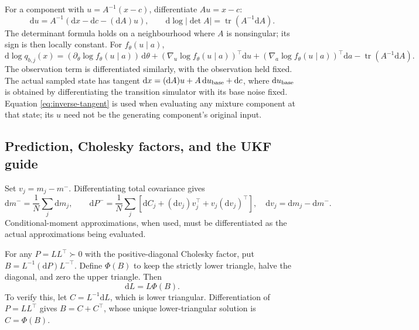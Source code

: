 \documentclass[11pt,a4paper]{article}
\newcommand{\tr}{\operatorname{tr}}
\newcommand{\dd}{\mathrm d}
\begin{document}
For a component with \(u=A^{-1}(x-c)\), differentiate \(Au=x-c\):
\begin{equation}
\label{eq:inverse-tangent}
 \dd u=A^{-1}(\dd x-\dd c-(\dd A)u),\qquad
 \dd\log|\det A|=\tr(A^{-1}\dd A).
\end{equation}
The determinant formula holds on a neighbourhood where \(A\) is
nonsingular; its sign is then locally constant. For \(f_\theta(u\mid a)\),
\begin{equation}
\label{eq:component-tangent}
 \dd\log q_{b,j}(x)
 =(\partial_\theta\log f_\theta(u\mid a))\,\dd\theta
  +(\nabla_u\log f_\theta(u\mid a))^\top\dd u
  +(\nabla_a\log f_\theta(u\mid a))^\top\dd a
  -\tr(A^{-1}\dd A).
\end{equation}
The observation term is differentiated similarly, with the observation
held fixed. The actual sampled state has tangent
\(\dd x=(\dd A)u+A\,\dd u_{\rm base}+\dd c\), where
\(\dd u_{\rm base}\) is obtained by differentiating the transition simulator
with its base noise fixed. Equation \eqref{eq:inverse-tangent} is used
when evaluating any mixture component at that state; its \(u\) need not
be the generating component's original input.

\subsection{Prediction, Cholesky factors, and the UKF guide}

Set \(v_j=m_j-m^-\). Differentiating total covariance gives
\begin{equation}
\label{eq:prediction-tangent}
 \dd m^-=\frac1N\sum_j\dd m_j,\qquad
 \dd P^-=\frac1N\sum_j\left[
 \dd C_j+(\dd v_j)v_j^\top+v_j(\dd v_j)^\top\right],
 \quad \dd v_j=\dd m_j-\dd m^-.
\end{equation}
Conditional-moment approximations, when used, must be differentiated as
the actual approximations being evaluated.

For any \(P=LL^\top\succ0\) with the positive-diagonal Cholesky factor,
put \(B=L^{-1}(\dd P)L^{-\top}\). Define \(\Phi(B)\) to keep the strictly
lower triangle, halve the diagonal, and zero the upper triangle. Then
\begin{equation}
\label{eq:chol-tangent}
 \dd L=L\Phi(B).
\end{equation}
To verify this, let \(C=L^{-1}\dd L\), which is lower triangular.
Differentiation of \(P=LL^\top\) gives \(B=C+C^\top\), whose unique
lower-triangular solution is \(C=\Phi(B)\).
\end{document}
